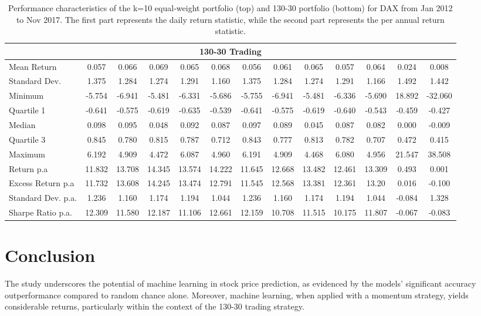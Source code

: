 \documentclass{article}
\begin{document}
\begin{table}[h]
\begin{tabular}{|p{2.4cm}|ccccc|ccccc|cc|}
\multicolumn{13}{|c|}{\textbf{130-30 Trading}} \\ \hline
Mean Return & 0.057 & 0.066 & 0.069 & 0.065 & 0.068 
& 0.056 & 0.061 & 0.065 & 0.057 & 0.064 
& 0.024 & 0.008\\
Standard Dev. & 1.375 & 1.284 & 1.274 & 1.291& 1.160& 1.375 & 1.284 & 1.274 & 1.291 & 1.166 
& 1.492 & 1.442\\
Minimum & -5.754 & -6.941 & -5.481 & -6.331 & -5.686 & -5.755 & -6.941 & -5.481 & -6.336 & -5.690
& 18.892  & -32.060\\
Quartile 1 & -0.641 & -0.575 & -0.619 & -0.635 & -0.539 & -0.641 & -0.575 & -0.619 & -0.640 & -0.543 
& -0.459 &  -0.427\\
Median & 0.098 & 0.095 & 0.048 & 0.092 & 0.087 & 0.097 & 0.089 & 0.045 & 0.087 & 0.082
& 0.000 & -0.009\\
Quartile 3  & 0.845 & 0.780 & 0.815 & 0.787 & 0.712 & 0.843 & 0.777 & 0.813 & 0.782 & 0.707 
& 0.472 & 0.415\\
Maximum & 6.192 & 4.909 & 4.472 & 6.087 & 4.960  & 6.191 & 4.909 & 4.468 & 6.080 & 4.956 
& 21.547 & 38.508\\
\hline
Return p.a  & 11.832 & 13.708 & 14.345 & 13.574 & 14.222 
& 11.645 & 12.668 & 13.482 & 12.461 & 13.309
& 0.493 & 0.001
\\
Excess Return p.a &  11.732 & 13.608 & 14.245 & 13.474 & 12.791
& 11.545 & 12.568 & 13.381 & 12.361 & 13.20
& 0.016 & -0.100
\\
Standard Dev. p.a. & 1.236 & 1.160 & 1.174 & 1.194 & 1.044
& 1.236 & 1.160 & 1.174 & 1.194 & 1.044 
& -0.084 & 1.328
\\
Sharpe Ratio p.a.  & 12.309 & 11.580 & 12.187 & 11.106 & 12.661
& 12.159 & 10.708 & 11.515 & 10.175 & 11.807
& -0.067 & -0.083
\\
\hline
\end{tabular}
\caption{Performance characteristics of the k=10 equal-weight portfolio (top) and 130-30 portfolio (bottom) for DAX from Jan 2012 to Nov 2017. The first part represents the daily return statistic, while the second part represents the per annual return statistic.}
\label{tab: dax_daily_return_summary}
\end{table}

\section{Conclusion}
\label{conclusion}
The study underscores the potential of machine learning in stock price prediction, as evidenced by the models' significant accuracy outperformance compared to random chance alone. Moreover, machine learning, when applied with a momentum strategy, yields considerable returns, particularly within the context of the 130-30 trading strategy.
\end{document}

